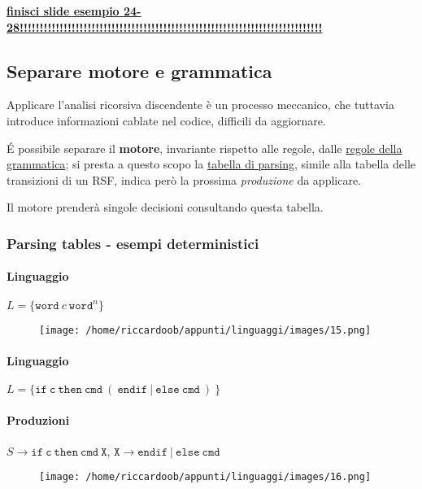 \underline{\textbf{finisci slide esempio 24-28!!!!!!!!!!!!!!!!!!!!!!!!!!!!!!!!!!!!!!!!!!!!!!!!!!!!!!!!!!!!!!!!!!!!!!!!!!!!}}

\subsection{Separare motore e grammatica}
Applicare l'analisi ricorsiva discendente è un processo meccanico, che tuttavia introduce informazioni cablate nel codice, difficili da aggiornare.

É possibile separare il \textbf{motore}, invariante rispetto alle regole, dalle \underline{regole della grammatica}; si presta a questo scopo la \underline{tabella di parsing}, simile alla tabella delle transizioni di un RSF, indica però la prossima \textit{produzione} da applicare.

Il motore prenderà singole decisioni consultando questa tabella.

\subsubsection{Parsing tables - esempi deterministici}

\paragraph{Linguaggio} $L = \{\texttt{word}\ c\ \texttt{word}^n\}$

\begin{figure}[H]
    \centering
    \texttt{[image: /home/riccardoob/appunti/linguaggi/images/15.png]}
\end{figure}

\paragraph{Linguaggio} $L = \{\texttt{if}\ \texttt{c}\ \texttt{then}\ \texttt{cmd}\ (\ \texttt{endif}\ |\ \texttt{else}\ \texttt{cmd}\ )\ \}$ 

\paragraph{Produzioni} $S \rightarrow \texttt{if}\ \texttt{c}\ \texttt{then} \ \texttt{cmd} \ \texttt{X} $, $\texttt{X}  \rightarrow \texttt{endif}\ |\ \texttt{else}\ \texttt{cmd} $ 

\begin{figure}[H]
    \centering
    \texttt{[image: /home/riccardoob/appunti/linguaggi/images/16.png]}
\end{figure}


